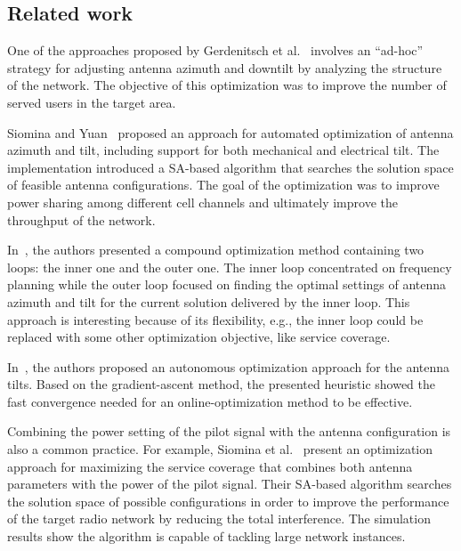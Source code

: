 \subsection*{Related work}

One of the approaches proposed by Gerdenitsch et al.~\cite{Antenna.tilt.and.CPICH:2003}
involves an ``ad-hoc'' strategy for adjusting antenna azimuth and
downtilt by analyzing the structure of the network. The objective
of this optimization was to improve the number of served users in
the target area. 

Siomina and Yuan~\cite{Antenna.Configuration:2008} proposed an approach
for automated optimization of antenna azimuth and tilt, including
support for both mechanical and electrical tilt. The implementation
introduced a SA-based algorithm that searches the solution space of
feasible antenna configurations. The goal of the optimization was
to improve power sharing among different cell channels and ultimately
improve the throughput of the network.

In~\cite{Antenna.azimuth.tilt:2009}, the authors presented a compound
optimization method containing two loops: the inner one and the outer
one. The inner loop concentrated on frequency planning while the outer
loop focused on finding the optimal settings of antenna azimuth and
tilt for the current solution delivered by the inner loop. This approach
is interesting because of its flexibility, e.g., the inner loop could
be replaced with some other optimization objective, like service coverage.

In~\cite{Eckhardt-Vertical_antenna_tilt_optimization_for_LTE:2011},
the authors proposed an autonomous optimization approach for the antenna
tilts. Based on the gradient-ascent method, the presented heuristic
showed the fast convergence needed for an online-optimization method
to be effective. 

\bigskip{}


Combining the power setting of the pilot signal with the antenna configuration
is also a common practice. For example, Siomina et al.~\cite{Coverage.optimization.on.CPICH.tilt.and.azimuth:2006}
present an optimization approach for maximizing the service coverage
that combines both antenna parameters with the power of the pilot
signal. Their SA-based algorithm searches the solution space of possible
configurations in order to improve the performance of the target radio
network by reducing the total interference. The simulation results
show the algorithm is capable of tackling large network instances.

